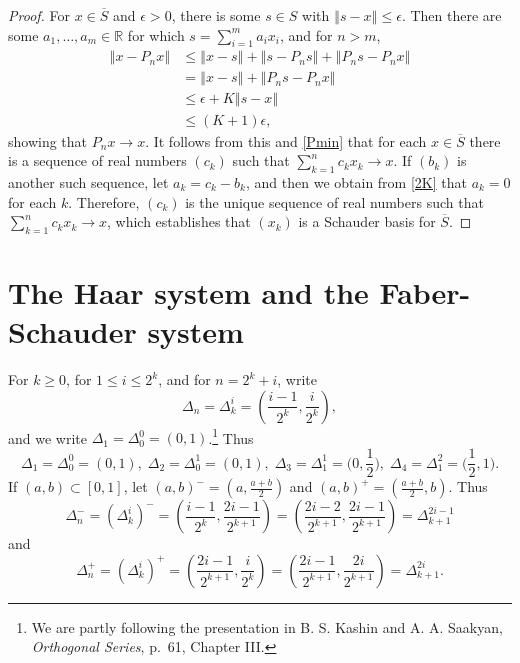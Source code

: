 \documentclass{article}
\newcommand{\norm}[1]{\left\Vert #1 \right\Vert}
\theoremstyle{definition}
\begin{document}
\begin{proof}
For $x \in \overline{S}$ and $\epsilon>0$, there is 
some $s \in S$ with $\norm{s-x} \leq \epsilon$. 
Then there are some $a_1,\ldots,a_m \in \mathbb{R}$ for which $s = \sum_{i=1}^m a_i x_i$, and for $n>m$,
\begin{align*}
\norm{x-P_n x}&\leq \norm{x-s}+\norm{s-P_n s}+\norm{P_n s-  P_n x}\\
&=  \norm{x-s} +\norm{P_n s -P_n x}\\
&\leq \epsilon+K \norm{s-x}\\
&\leq (K+1)\epsilon,
\end{align*}
showing that $P_n x \to x$. It follows from this and \eqref{Pmin} that for each $x \in \overline{S}$ there is a sequence
of real numbers $(c_k)$ such that $\sum_{k=1}^n c_k x_k \to x$. 
If $(b_k)$ is another such sequence, let $a_k=c_k-b_k$, and then we obtain from \eqref{2K}
that $a_k=0$ for each $k$. Therefore, $(c_k)$ is the unique sequence of real numbers such that
$\sum_{k=1}^n c_k x_k \to x$, which establishes that $(x_k)$ is a Schauder basis for $\overline{S}$.
\end{proof}



\section{The Haar system and the Faber-Schauder system}
For $k \geq 0$, for $1 \leq i \leq 2^k$, and for $n=2^k+i$, write
\[
\Delta_n = \Delta_k^i = \left( \frac{i-1}{2^k},\frac{i}{2^k}\right),
\]
and we write $\Delta_1 = \Delta_0^0 = (0,1)$.\footnote{We are partly following the presentation in
B. S. Kashin and A. A. Saakyan, {\em Orthogonal Series}, p.~61, Chapter III.}
Thus
\[
\Delta_1 = \Delta_0^0 = (0,1),\; \Delta_2 = \Delta_0^1 = (0,1),
\; \Delta_3 = \Delta_1^1 = \Big(0,\frac{1}{2}\Big),
\; \Delta_4 = \Delta_1^2 = \Big(\frac{1}{2},
1\Big). 
\]
If $(a,b) \subset [0,1]$, let $(a,b)^- = \left(a,\frac{a+b}{2}\right)$ and $(a,b)^+=\left(\frac{a+b}{2},b\right)$. 
Thus
\[
\Delta_n^-=(\Delta_k^i)^-=\left(\frac{i-1}{2^k}, \frac{2i-1}{2^{k+1}}\right) 
=\left(\frac{2i-2}{2^{k+1}},  \frac{2i-1}{2^{k+1}}\right) 
=\Delta_{k+1}^{2i-1}
\]
and
\[
\Delta_n^+=(\Delta_k^i)^+=\left(\frac{2i-1}{2^{k+1}}, \frac{i}{2^{k}}\right) 
=\left(\frac{2i-1}{2^{k+1}},  \frac{2i}{2^{k+1}}\right) 
=\Delta_{k+1}^{2i}.
\]
\end{document}
